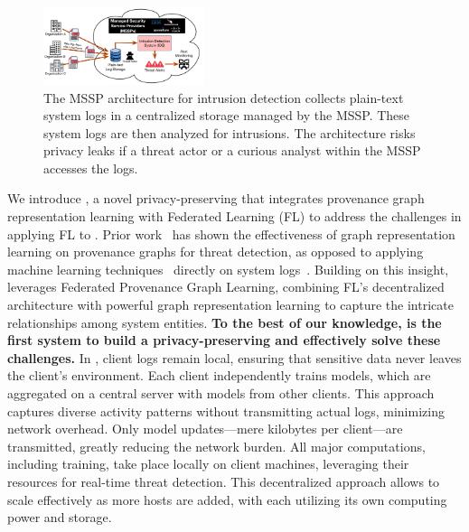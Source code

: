 \begin{figure}[t!]
  \centering
  \includegraphics[width=0.42\textwidth]{fig/mssp.pdf}
  \caption{The MSSP architecture for intrusion detection collects plain-text system logs in a centralized storage managed by the MSSP. These system logs are then analyzed for intrusions. The architecture risks privacy leaks if a threat actor or a curious analyst within the MSSP accesses the logs.}
  \label{mssp}
  \vspace{-4ex}
\end{figure}

\smallskip
{}
\smallskip

\noindent
We introduce \Sys, a novel privacy-preserving \pids that integrates provenance graph representation learning with Federated Learning (FL) to address the challenges in applying FL to \pids. Prior work~\cite{wang2022threatrace} has shown the effectiveness of graph representation learning on provenance graphs for threat detection, as opposed to applying machine learning techniques~\cite{chowdhary2020natural, goodfellow2020generative} directly on system logs~\cite{deeplog2017, xia2019loggan}. Building on this insight, \Sys leverages Federated Provenance Graph Learning, combining FL’s decentralized architecture with powerful graph representation learning to capture the intricate relationships among system entities. {\bf To the best of our knowledge, \Sys is the first system to build a privacy-preserving \pids and effectively solve these challenges.} In \Sys, client logs remain local, ensuring that sensitive data never leaves the client's environment. Each client independently trains \gnnshort models, which are aggregated on a central server with models from other clients. This approach captures diverse activity patterns without transmitting actual logs, minimizing network overhead. Only model updates—mere kilobytes per client—are transmitted, greatly reducing the network burden. All major computations, including training, take place locally on client machines, leveraging their resources for real-time threat detection. This decentralized approach allows \Sys to scale effectively as more hosts are added, with each utilizing its own computing power and storage.

